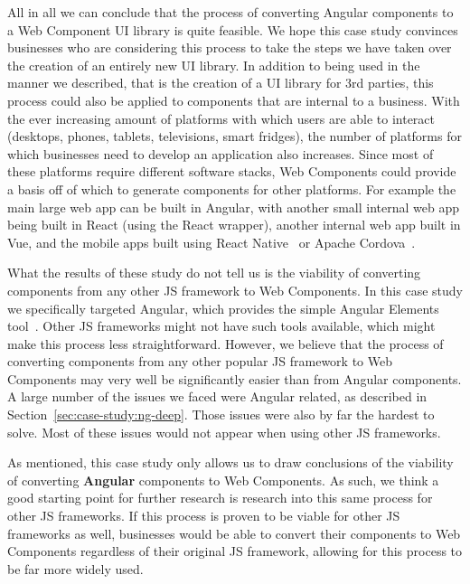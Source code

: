 All in all we can conclude that the process of converting Angular components to a Web Component UI library is quite feasible. We hope this case study convinces businesses who are considering this process to take the steps we have taken over the creation of an entirely new UI library. In addition to being used in the manner we described, that is the creation of a UI library for 3rd parties, this process could also be applied to components that are internal to a business. With the ever increasing amount of platforms with which users are able to interact (desktops, phones, tablets, televisions, smart fridges), the number of platforms for which businesses need to develop an application also increases. Since most of these platforms require different software stacks, Web Components could provide a basis off of which to generate components for other platforms. For example the main large web app can be built in Angular, with another small internal web app being built in React (using the React wrapper), another internal web app built in Vue, and the mobile apps built using React Native~ or Apache Cordova~.

What the results of these study do not tell us is the viability of converting components from any other JS framework to Web Components. In this case study we specifically targeted Angular, which provides the simple Angular Elements tool~. Other JS frameworks might not have such tools available, which might make this process less straightforward. However, we believe that the process of converting components from any other popular JS framework to Web Components may very well be significantly easier than from Angular components. A large number of the issues we faced were Angular related, as described in Section~\ref{sec:case-study:ng-deep}. Those issues were also by far the hardest to solve. Most of these issues would not appear when using other JS frameworks.

As mentioned, this case study only allows us to draw conclusions of the viability of converting \textbf{Angular} components to Web Components. As such, we think a good starting point for further research is research into this same process for other JS frameworks. If this process is proven to be viable for other JS frameworks as well, businesses would be able to convert their components to Web Components regardless of their original JS framework, allowing for this process to be far more widely used.